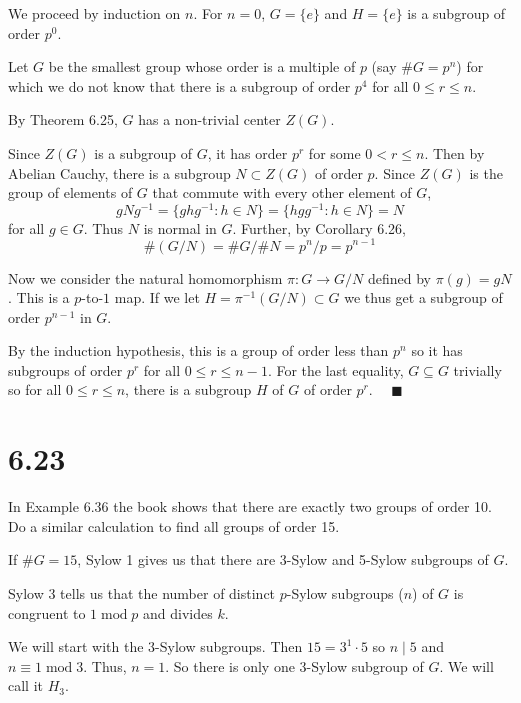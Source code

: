 \documentclass[12pt]{article}
\newcommand{\qed}{\quad \blacksquare}
\renewcommand{\mod}{\;\text{mod}\;}
\begin{document}
    \color{blue}
        We proceed by induction on $n$. For $n = 0$, $G = \{e\}$ and $H = \{e\}$ is a subgroup of order $p^0$. 

        Let $G$ be the smallest group whose order is a multiple of $p$ (say $\#G = p^n$) for which we do not know that there is a subgroup of order $p^4$ for all $0\leq r \leq n$.
        
        By Theorem 6.25, $G$ has a non-trivial center $Z(G)$.
        
        Since $Z(G)$ is a subgroup of $G$, it has order $p^r$ for some $0 < r \leq n$. Then by Abelian Cauchy, there is a subgroup $N \subset Z(G)$ of order $p$. Since $Z(G)$ is the group of elements of $G$ that commute with every other element of $G$, 
        \[gNg^{-1} = \{ghg^{-1} : h\in N\} = \{hgg^{-1}: h \in N\} = N\]
        for all $g \in G$. Thus $N$ is normal in $G$. Further, by Corollary 6.26, 
        \[\#(G/N) = \#G/\#N = p^n/p = p^{n-1}\]
        
        Now we consider the natural homomorphism $\pi: G \to G/N$ defined by $\pi(g) = gN$. This is a $p$-to-$1$ map. If we let $H = \pi^{-1}(G/N) \subset G$ we thus get a subgroup of order $p^{n-1}$ in $G$. 

        By the induction hypothesis, this is a group of order less than $p^n$ so it has subgroups of order $p^r$ for all $0 \leq r \leq n-1$. For the last equality, $G \subseteq G$ trivially so for all $0 \leq r \leq n$, there is a subgroup $H$ of $G$ of order $p^r$. $\qed$
        
    \color{black}


\pagebreak

\section*{6.23}
In Example 6.36 the book shows that there are exactly two groups of order 10. Do a similar calculation to find all groups of order 15.

    \color{blue}
        If $\#G = 15$, Sylow 1 gives us that there are 3-Sylow and 5-Sylow subgroups of $G$. 

        Sylow 3 tells us that the number of distinct $p$-Sylow subgroups ($n$) of $G$ is congruent to $1 \mod p$ and divides $k$.

        We will start with the 3-Sylow subgroups. Then $15 = 3^1 \cdot 5$ so $n \mid 5$ and $n \equiv 1 \mod 3$. Thus, $n = 1$. So there is only one 3-Sylow subgroup of $G$. We will call it $H_3$. 
\end{document}

